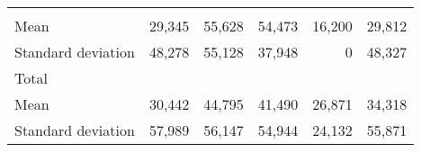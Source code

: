 \begin{tabular}{llllll}
  \multicolumn{1}{r}{} &
  \multicolumn{1}{r}{} &
  \multicolumn{1}{r}{} &
  \multicolumn{1}{r}{} \\
\multicolumn{1}{l}{\hspace{4em}Mean} &
  \multicolumn{1}{|r}{29,345} &
  \multicolumn{1}{r}{55,628} &
  \multicolumn{1}{r}{54,473} &
  \multicolumn{1}{r}{16,200} &
  \multicolumn{1}{r}{29,812} \\
\multicolumn{1}{l}{\hspace{4em}Standard deviation} &
  \multicolumn{1}{|r}{48,278} &
  \multicolumn{1}{r}{55,128} &
  \multicolumn{1}{r}{37,948} &
  \multicolumn{1}{r}{0} &
  \multicolumn{1}{r}{48,327} \\
\multicolumn{1}{l}{\hspace{3em}Total} &
  \multicolumn{1}{|r}{} &
  \multicolumn{1}{r}{} &
  \multicolumn{1}{r}{} &
  \multicolumn{1}{r}{} &
  \multicolumn{1}{r}{} \\
\multicolumn{1}{l}{\hspace{4em}Mean} &
  \multicolumn{1}{|r}{30,442} &
  \multicolumn{1}{r}{44,795} &
  \multicolumn{1}{r}{41,490} &
  \multicolumn{1}{r}{26,871} &
  \multicolumn{1}{r}{34,318} \\
\multicolumn{1}{l}{\hspace{4em}Standard deviation} &
  \multicolumn{1}{|r}{57,989} &
  \multicolumn{1}{r}{56,147} &
  \multicolumn{1}{r}{54,944} &
  \multicolumn{1}{r}{24,132} &
  \multicolumn{1}{r}{55,871} \\
\cline{1-6}
\end{tabular}

